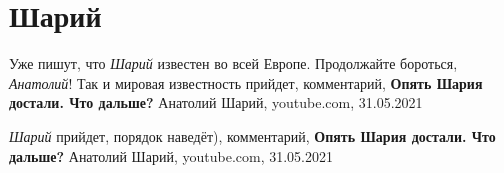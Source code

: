 
 
 
 
 
\chapter{Шарий}

Уже пишут, что \emph{Шарий} известен во всей Европе. Продолжайте  бороться, \emph{Анатолий}!  Так и мировая известность прийдет,
комментарий, \textbf{Опять Шария достали. Что дальше?} Анатолий Шарий, youtube.com, 31.05.2021

\emph{Шарий} прийдет, порядок наведёт),
комментарий, \textbf{Опять Шария достали. Что дальше?} Анатолий Шарий, youtube.com, 31.05.2021
